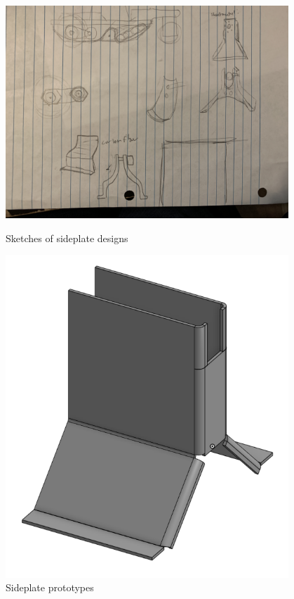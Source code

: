 \begin{figure}[ht]
\centering
\begin{minipage}[b]{.48\textwidth}
  \centering
  \includegraphics[width=0.95\textwidth]{Meetings/November/11-26-21/11-26-21_CAD_Figure1 - Nathan Forrer.JPG}
  \caption{Sketches of sideplate designs}
  \label{fig:pic1}
\end{minipage}%
\hfill%
\begin{minipage}[b]{.48\textwidth}
  \centering
  \includegraphics[width=0.95\textwidth]{Meetings/November/11-26-21/11-26-21_CAD_Figure2 - Nathan Forrer.PNG}
  \caption{Sideplate prototypes}
  \label{fig:pic2}
\end{minipage}
\end{figure}

